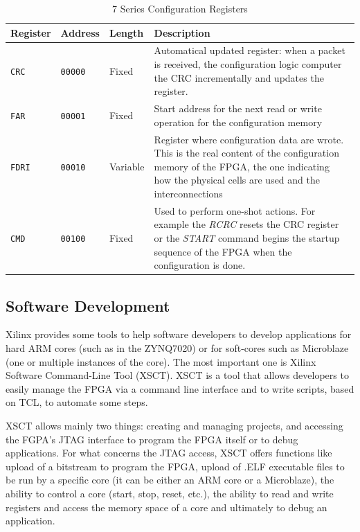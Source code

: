 \begin{table}[H]
\centering
    \begin{tabular}{p{2cm}|p{2cm}|p{1.5cm}|p{7cm}}
        \textbf{Register} & \textbf{Address} & \textbf{Length} & \textbf{Description} \\
        \hline
        \texttt{CRC} & \texttt{00000} & Fixed & Automatical updated register: when a packet is received, the configuration logic computer the CRC incrementally and updates the register. \\
        \hline
        \texttt{FAR} & \texttt{00001} & Fixed & Start address for the next read or write operation for the configuration memory\\
        \hline
        \texttt{FDRI} & \texttt{00010} & Variable & Register where configuration data are wrote. This is the real content of the configuration memory of the FPGA, the one indicating how the physical cells are used and the interconnections\\
        \hline
        \texttt{CMD} & \texttt{00100} & Fixed & Used to perform one-shot actions. For example the \textit{RCRC} resets the CRC register or the \textit{START} command begins the startup sequence of the FPGA when the configuration is done.\\
    \end{tabular}
\caption{7 Series Configuration Registers}
\label{tab:conf_regs}
\end{table}


\subsection{Software Development}

Xilinx provides some tools to help software developers to develop applications for hard ARM cores (such as in the ZYNQ7020) or for soft-cores such as Microblaze (one or multiple instances of the core). The most important one is Xilinx Software Command-Line Tool (XSCT). XSCT is a tool that allows developers to easily manage the FPGA via a command line interface and to write scripts, based on TCL, to automate some steps. \bigskip

XSCT allows mainly two things: creating and managing projects, and accessing the FGPA's JTAG interface to program the FPGA itself or to debug applications. For what concerns the JTAG access, XSCT offers functions like upload of a bitstream to program the FPGA, upload of .ELF executable files to be run by a specific core (it can be either an ARM core or a Microblaze), the ability to control a core (start, stop, reset, etc.), the ability to read and write registers and access the memory space of a core and ultimately to debug an application. \bigskip

